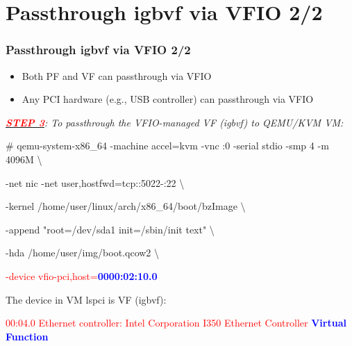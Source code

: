 \documentclass[aspectratio=169]{beamer}
\begin{document}

\section{Passthrough igbvf via VFIO 2/2}
\begin{frame}
\frametitle{Passthrough igbvf via VFIO 2/2}
\begin{itemize}
\item Both PF and VF can passthrough via VFIO
\item Any PCI hardware (e.g., USB controller) can passthrough via VFIO
\end{itemize}
\begin{block}{}
\textit{\underline{\textbf{\textcolor{red}{STEP 3}}}: To passthrough the VFIO-managed VF (igbvf) to QEMU/KVM VM:}

\vspace{2 mm}

\# qemu-system-x86\_64 -machine accel=kvm -vnc :0 -serial stdio -smp 4 -m 4096M \textbackslash

-net nic -net user,hostfwd=tcp::5022-:22 \textbackslash

-kernel /home/user/linux/arch/x86\_64/boot/bzImage \textbackslash
	
-append "root=/dev/sda1 init=/sbin/init text" \textbackslash

-hda /home/user/img/boot.qcow2 \textbackslash

\textcolor{red}{-device vfio-pci,host=\textbf{\textcolor{blue}{0000:02:10.0}}}
\end{block}
\begin{block}{}
The device in VM lspci is VF (igbvf):

\textcolor{red}{00:04.0 Ethernet controller: Intel Corporation I350 Ethernet Controller \textbf{\textcolor{blue}{Virtual Function}}}
\end{block}
\end{frame}

\end{document}
